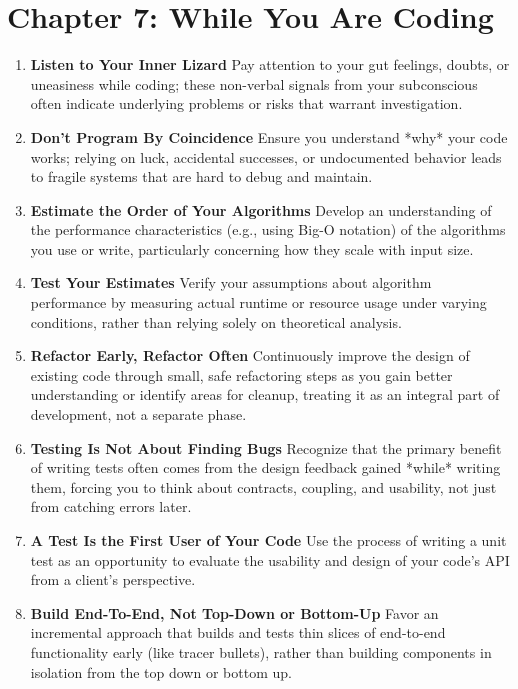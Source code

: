 \documentclass[11pt]{article}
\begin{document}
\section*{Chapter 7: While You Are Coding}
\begin{enumerate}[label=\arabic*., start=61, itemsep=1ex]
    \item \textbf{Listen to Your Inner Lizard}
    Pay attention to your gut feelings, doubts, or uneasiness while coding; these non-verbal signals from your subconscious often indicate underlying problems or risks that warrant investigation.

    \item \textbf{Don't Program By Coincidence}
    Ensure you understand *why* your code works; relying on luck, accidental successes, or undocumented behavior leads to fragile systems that are hard to debug and maintain.

    \item \textbf{Estimate the Order of Your Algorithms}
    Develop an understanding of the performance characteristics (e.g., using Big-O notation) of the algorithms you use or write, particularly concerning how they scale with input size.

    \item \textbf{Test Your Estimates}
    Verify your assumptions about algorithm performance by measuring actual runtime or resource usage under varying conditions, rather than relying solely on theoretical analysis.

    \item \textbf{Refactor Early, Refactor Often}
    Continuously improve the design of existing code through small, safe refactoring steps as you gain better understanding or identify areas for cleanup, treating it as an integral part of development, not a separate phase.

    \item \textbf{Testing Is Not About Finding Bugs}
    Recognize that the primary benefit of writing tests often comes from the design feedback gained *while* writing them, forcing you to think about contracts, coupling, and usability, not just from catching errors later.

    \item \textbf{A Test Is the First User of Your Code}
    Use the process of writing a unit test as an opportunity to evaluate the usability and design of your code's API from a client's perspective.

    \item \textbf{Build End-To-End, Not Top-Down or Bottom-Up}
    Favor an incremental approach that builds and tests thin slices of end-to-end functionality early (like tracer bullets), rather than building components in isolation from the top down or bottom up.


\end{enumerate}
\end{document}
